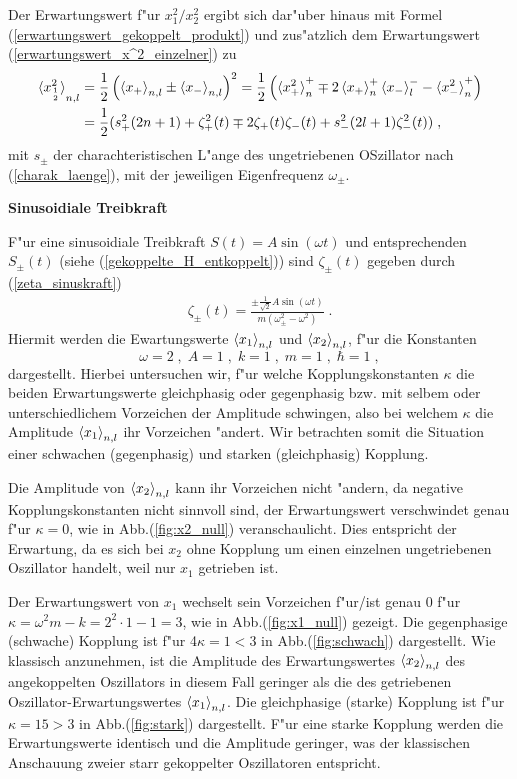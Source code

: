     Der Erwartungswert f"ur $x_{1}^2/x_2^2$ ergibt sich dar"uber hinaus mit Formel (\ref{erwartungswert_gekoppelt_produkt}) und zus"atzlich dem Erwartungswert (\ref{erwartungswert_x^2_einzelner}) zu
    \begin{align}
      \braket{x_{1\atop 2}^2}_{n,l}&=\frac{1}{2}\left(\braket{x_+}_{n,l}\pm\braket{x_-}_{n,l}\right)^2
      =\frac{1}{2}\left(\braket{x_+^2}_n^+ \mp 2\braket{x_+}_n^+\braket{x_-}_l^- - \braket{x_-^2}_n^+\right) \notag\\
      &=\frac 1 2 (s_+^2(2n+1)+\zeta_+^2(t) \mp 2\zeta_+(t)\zeta_-(t) + s_-^2(2l+1)\zeta_-^2(t)) \; ,
    \end{align}
    mit $s_\pm$ der charachteristischen L"ange des ungetriebenen OSzillator nach (\ref{charak_laenge}), mit der jeweiligen Eigenfrequenz $\omega_\pm$.

    \textbf{Sinusoidiale Treibkraft}

    F"ur eine sinusoidiale Treibkraft $S(t)=A\sin(\omega t)$ und entsprechenden $S_\pm(t)$ (siehe (\ref{gekoppelte_H_entkoppelt})) sind $\zeta_\pm(t)$ gegeben durch (\ref{zeta_sinuskraft})
    \begin{align}
      \zeta_\pm(t) = \frac{\pm\frac{1}{\sqrt 2} A\sin(\omega t)}{m(\omega_\pm^2 - \omega^2)} \; .
    \end{align}
    Hiermit werden die Ewartungswerte $\braket{x_1}_{n,l}$ und $\braket{x_2}_{n,l}$, f"ur die Konstanten
    \begin{equation}
      \omega=2 \;,\; A=1 \;,\; k=1 \;,\; m=1 \;,\; \hbar=1 \; ,
    \end{equation}
    dargestellt.
    Hierbei untersuchen wir, f"ur welche Kopplungskonstanten $\kappa$ die beiden Erwartungswerte gleichphasig oder gegenphasig bzw. mit selbem oder unterschiedlichem Vorzeichen der Amplitude schwingen, also bei welchem $\kappa$ die Amplitude $\braket{x_1}_{n,l}$ ihr Vorzeichen "andert.
    Wir betrachten somit die Situation einer schwachen (gegenphasig) und starken (gleichphasig) Kopplung.

    Die Amplitude von $\braket{x_2}_{n,l}$ kann ihr Vorzeichen nicht "andern, da negative Kopplungskonstanten nicht sinnvoll sind, der Erwartungswert verschwindet genau f"ur $\kappa=0$, wie in Abb.(\ref{fig:x2_null}) veranschaulicht.
    Dies entspricht der Erwartung, da es sich bei $x_2$ ohne Kopplung um einen einzelnen ungetriebenen Oszillator handelt, weil nur $x_1$ getrieben ist.

    Der Erwartungswert von $x_1$ wechselt sein Vorzeichen f"ur/ist genau 0 f"ur $\kappa=\omega^2m-k = 2^2\cdot1-1=3$, wie in Abb.(\ref{fig:x1_null}) gezeigt.
    Die gegenphasige (schwache) Kopplung ist f"ur 4$\kappa=1<3$ in Abb.(\ref{fig:schwach}) dargestellt. Wie klassisch anzunehmen, ist die Amplitude des Erwartungswertes $\braket{x_2}_{n,l}$ des angekoppelten Oszillators in diesem Fall geringer als die des getriebenen Oszillator-Erwartungswertes $\braket{x_1}_{n,l}$.
    Die gleichphasige (starke) Kopplung ist f"ur $\kappa=15>3$ in Abb.(\ref{fig:stark}) dargestellt.
    F"ur eine starke Kopplung werden die Erwartungswerte identisch und die Amplitude geringer, was der klassischen Anschauung zweier starr gekoppelter Oszillatoren entspricht.


